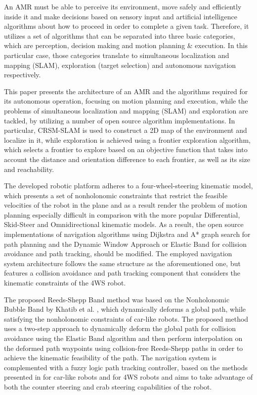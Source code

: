 \documentclass[conference]{IEEEtran}
\begin{document}
An AMR must be able to perceive its environment, move safely and efficiently inside it and make decisions based on sensory input and artificial intelligence algorithms about how to proceed in order to complete a given task. Therefore, it utilizes a set of algorithms that can be separated into three basic categories, which are perception, decision making and motion planning \& execution. In this particular case, those categories translate to simultaneous localization and mapping (SLAM), exploration (target selection) and autonomous navigation respectively.

This paper presents the architecture of an AMR and the algorithms required for its autonomous operation, focusing on motion planning and execution, while the problems of simultaneous localization and mapping (SLAM) and exploration are tackled, by utilizing a number of open source algorithm implementations. In particular, CRSM-SLAM \cite{crsm} is used to construct a 2D map of the environment and localize in it, while exploration is achieved using a frontier exploration algorithm, which selects a frontier to explore based on an objective function that  takes into account the distance and orientation difference to each frontier, as well as its size and reachability.

The developed robotic platform adheres to a four-wheel-steering kinematic model, which presents a set of nonholonomic constraints that restrict the feasible velocities of the robot in the plane and as a result render the problem of motion planning especially difficult in comparison with the more popular Differential, Skid-Steer and Omnidirectional kinematic models. As a result, the open source implementations of navigation algorithms using Dijkstra and A* graph search for path planning and the Dynamic Window Approach \cite{dwa} or Elastic Band \cite{eband} for collision avoidance and path tracking, should be modified. The employed navigation system architecture follows the same structure as the aforementioned one, but features a collision avoidance and path tracking component that considers the kinematic constraints of the 4WS robot.

The proposed Reeds-Shepp Band method was based on the Nonholonomic Bubble Band by Khatib et al. \cite{dpm}, which dynamically deforms a global path, while satisfying the nonholonomic constraints of car-like robots. The proposed method uses a two-step approach to dynamically deform the global path for collision avoidance using the Elastic Band algorithm and then perform interpolation on the deformed path waypoints using collsion-free Reeds-Shepp paths \cite{reeds_shepp} in order to achieve the kinematic feasibility of the path. The navigation system is complemented with a fuzzy logic path tracking controller, based on the methods presented in \cite{flc_thesis} for car-like robots and \cite{reactive_fuzzy_ptc} for 4WS robots and aims to take advantage of both the counter steering and crab steering capabilities of the robot.
\end{document}
